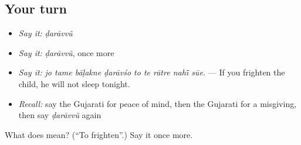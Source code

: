 \subsection*{Your turn}
\begin{itemize}
\raggedright
  \item \emph{Say it:} \emph{ḍarāvvũ}
  \item \emph{Say it:} \emph{ḍarāvvũ}, once more
  \item \emph{Say it:} \emph{jo tame bāḷakne ḍarāvśo to te rātre nahī̃ sūe.} — If you frighten the child, he will not sleep tonight.
  \item \emph{Recall:} say the Gujarati for peace of mind, then the Gujarati for a misgiving, then say \emph{ḍarāvvũ} again
\end{itemize}

\begin{tcolorbox}[breakable,colback=teal!4,colframe=teal!35!black,title={Before you move on}]
What does  mean? (\textquotedblleft{}To frighten\textquotedblright{}.) Say it once more.
\end{tcolorbox}
